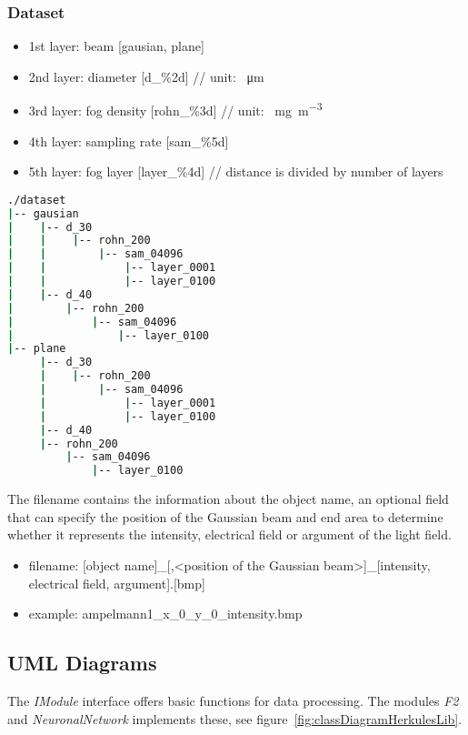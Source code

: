 \documentclass[
10pt, %
a4paper, %
onecolumn
portrait
]{article}
\begin{document}
\subsubsection{Dataset}
\begin{itemize}
	\item 1st layer: beam [gausian, plane]
	\item 2nd layer: diameter [d\_\%2d] // unit: \SI{}{\micro \meter}
	\item 3rd layer: fog density [rohn\_\%3d] // unit: \SI{}{\milli g\per \cubic m}
	\item 4th layer: sampling rate [sam\_\%5d]
	\item 5th layer: fog layer [layer\_\%4d] // distance is divided by number of layers
\end{itemize}
\begin{lstlisting}[language=bash, caption={Dataset example folder structure}]
./dataset
|-- gausian
|    |-- d_30
|    |    |-- rohn_200
|    |        |-- sam_04096
|    |            |-- layer_0001
|    |            |-- layer_0100
|    |-- d_40
|        |-- rohn_200
|            |-- sam_04096
|                |-- layer_0100
|-- plane
     |-- d_30
     |    |-- rohn_200
     |        |-- sam_04096
     |            |-- layer_0001
     |            |-- layer_0100
     |-- d_40
     |-- rohn_200
         |-- sam_04096
             |-- layer_0100

\end{lstlisting}

The filename contains the information about the object name, an optional field that can specify the position of the Gaussian beam and end area to determine whether it represents the intensity, electrical field or argument of the light field.

\begin{itemize}
	\item filename: [object name]\_[,<position of the Gaussian beam>]\_[intensity, electrical field, argument].[bmp]
	\item example: ampelmann1\_x\_0\_y\_0\_intensity.bmp
\end{itemize}

\newpage
\subsection{UML Diagrams}
The \textit{IModule} interface offers basic functions for data processing. The modules \textit{F2} and \textit{NeuronalNetwork} implements these, see figure~\ref{fig:classDiagramHerkulesLib}.
\end{document}
